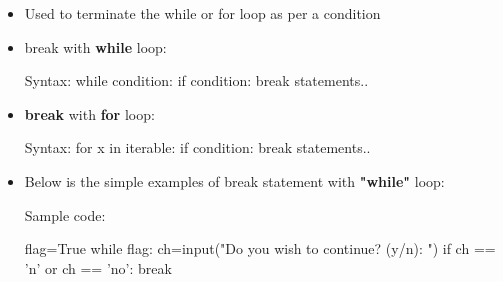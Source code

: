 \setlength{\columnsep}{3pt}

\begin{flushleft}

		\begin{itemize}
			\item Used to terminate the while or for loop as per a condition
			\item break with \textbf{while} loop:
			\begin{tcolorbox}[breakable,notitle,boxrule=1pt,colback=pink,colframe=pink]
				\color{black}
				\font=8pt
				Syntax: 
				\newline
				while condition: \newline
				\hphantom{} \hphantom{}  if condition: \newline
				\hphantom{} \hphantom{} \hphantom{} \hphantom{} break \newline
				\hphantom{} \hphantom{} statements..
				\font=4pt
			\end{tcolorbox}
		
			\item \textbf{break} with \textbf{for} loop:
			\begin{tcolorbox}[breakable,notitle,boxrule=1pt,colback=pink,colframe=pink]
				\color{black}
				\font=8pt
				Syntax: 
				\newline
				for x in iterable: \newline
				\hphantom{} \hphantom{}  if condition: \newline
				\hphantom{} \hphantom{} \hphantom{} \hphantom{} break \newline
				\hphantom{} \hphantom{} statements..
				\font=4pt
			\end{tcolorbox}			
		
			\bigskip
			\item Below is the simple examples of break statement with \textbf{"while"} loop:

			Sample code:
			\begin{tcolorbox}[breakable,notitle,boxrule=-0pt,colback=code,colframe=code]
				\color{white}
				\font=8pt
				flag=True \newline
				while flag: \newline
				\hphantom{} \hphantom{} ch=input("Do you wish to continue? (y/n): ") \newline
				\hphantom{} \hphantom{} if ch == 'n' or ch == 'no': \newline
				\hphantom{} \hphantom{} \hphantom{} \hphantom{} break
				\font=4pt
			\end{tcolorbox}
			

\end{itemize}
\end{flushleft}
